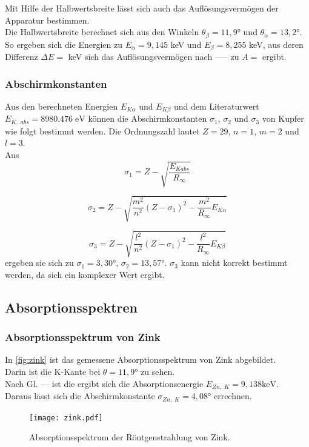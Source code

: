 Mit Hilfe der Halbwertsbreite lässt sich auch das Auflösungsvermögen der Apparatur bestimmen. \\
Die Halbwertsbreite berechnet sich aus den Winkeln $\theta_\beta = 11,9°$ und $\theta_\alpha = 13,2°$.\\
So ergeben sich die Energien zu $E_\alpha = 9,145$ keV und $E_\beta = 8,255$ keV, aus deren Differenz $\Delta E = $ keV sich das Auflösungsvermögen
nach ----- zu $A = $ ergibt.


\subsubsection*{Abschirmkonstanten}

Aus den berechneten Energien $E_{K \alpha}$ und $E_{K \beta}$ und dem Literaturwert $E_{K,\;abs} = 8980.476 \; \mathrm{eV}$ können die 
Abschirmkonstanten $\sigma_1$, $\sigma_2$ und $\sigma_3$ von Kupfer wie folgt bestimmt werden. Die Ordnungszahl lautet $Z = 29$, $n=1$, $m=2$ und $l=3$. \\
Aus 
\begin{equation*}
  \sigma_1=Z-\sqrt{\frac{E_{Kabs}}{R_\infty}}
  \end{equation*}
  
  \begin{equation*}
  \sigma_2=Z-\sqrt{ \frac{m^2}{n^2}(Z-\sigma_1)^2 - \frac{m^2}{R_\infty} E_{K\alpha}}
  \end{equation*}
  
  \begin{equation*}
      \sigma_3=Z-\sqrt{ \frac{l^2}{n^2}(Z-\sigma_1)^2 - \frac{l^2}{R_\infty} E_{K\beta}}
  \end{equation*}
ergeben sie sich zu $\sigma_1 = 3,30°$, $\sigma_2 = 13,57°$. 
$\sigma_3$ kann nicht korrekt bestimmt werden, da sich ein komplexer Wert ergibt.




\subsection{Absorptionsspektren}
\label{subsec:absorptionsspektrum}


\subsubsection*{Absorptionsspektrum von Zink}
In \autoref{fig:zink} ist das gemessene Absorptionsspektrum von Zink abgebildet.\\
Darin ist die K-Kante bei $\theta = 11,9°$ zu sehen. \\
Nach Gl. --- ist die ergibt sich die Absorptionsenergie $E_{Zn, \; K} = 9,138 \mathrm{ keV}$.\\
Daraus lässt sich die Abschirmkonstante $\sigma_{Zn, \; K} = 4,08°$ errechnen.
\begin{figure}
  \centering
  \texttt{[image: zink.pdf]}
  \caption{Absorptionsspektrum der Röntgenstrahlung von Zink.}
  \label{fig:zink}
\end{figure}


